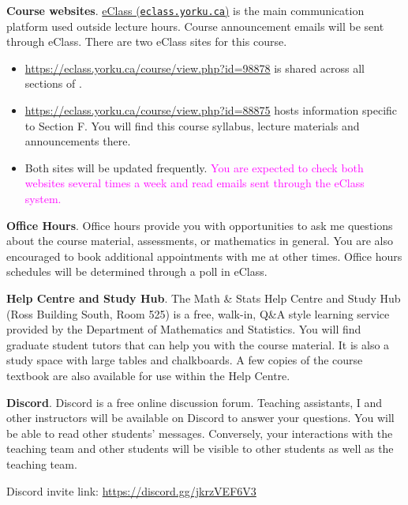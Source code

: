 \documentclass[./main.tex]{subfiles}
\begin{document}
\textbf{Course websites}. \href{https://eclass.yorku.ca}{eClass (\texttt{eclass.yorku.ca})} is the main communication platform used outside lecture hours. Course announcement emails will be sent through eClass. There are two eClass sites for this course. 
\begin{itemize}
\item \url{https://eclass.yorku.ca/course/view.php?id=98878} is shared across all sections of \thecoursecode.
\item \url{https://eclass.yorku.ca/course/view.php?id=88875} hosts information specific to Section F. You will find this course syllabus, lecture materials and announcements there.
\item[{\faIcon{exclamation-circle}}] Both sites will be updated frequently. \textcolor{magenta}{ You are expected to check both websites several times a week and read emails sent through the eClass system.}
\end{itemize}

\textbf{Office Hours}. Office hours provide you with opportunities to ask me questions about the course material, assessments, or mathematics in general. You are also encouraged to book additional appointments with me at other times. Office hours schedules will be determined through a poll in eClass. 

\textbf{Help Centre and Study Hub}. The Math \& Stats Help Centre and Study Hub (Ross Building South, Room 525) is a free, walk-in, Q\&A style learning service provided by the Department of Mathematics and Statistics. You will find graduate student tutors that can help you with the course material. It is also a study space with large tables and chalkboards. A few copies of the course textbook are also available for use within the Help Centre. 

\textbf{Discord}.  Discord is a free online discussion forum. Teaching assistants, I and other instructors will be available on Discord to answer your questions. You will be able to read other students' messages. Conversely, your interactions with the teaching team and other students will be visible to other students as well as the teaching team.

Discord invite link: \url{https://discord.gg/jkrzVEF6V3}
\end{document}
